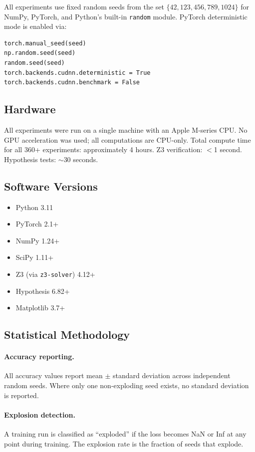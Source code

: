 \documentclass[10pt]{article}
\begin{document}
All experiments use fixed random seeds from the set $\{42, 123, 456, 789, 1024\}$ for NumPy, PyTorch, and Python's built-in \texttt{random} module.
PyTorch deterministic mode is enabled via:
\begin{verbatim}
torch.manual_seed(seed)
np.random.seed(seed)
random.seed(seed)
torch.backends.cudnn.deterministic = True
torch.backends.cudnn.benchmark = False
\end{verbatim}

\subsection{Hardware}

All experiments were run on a single machine with an Apple M-series CPU.
No GPU acceleration was used; all computations are CPU-only.
Total compute time for all 360+ experiments: approximately 4 hours.
Z3 verification: $<$1 second.
Hypothesis tests: $\sim$30 seconds.

\subsection{Software Versions}

\begin{itemize}[nosep]
    \item Python 3.11
    \item PyTorch 2.1+
    \item NumPy 1.24+
    \item SciPy 1.11+
    \item Z3 (via \texttt{z3-solver}) 4.12+
    \item Hypothesis 6.82+
    \item Matplotlib 3.7+
\end{itemize}

\subsection{Statistical Methodology}

\paragraph{Accuracy reporting.}
All accuracy values report mean $\pm$ standard deviation across independent random seeds.
Where only one non-exploding seed exists, no standard deviation is reported.

\paragraph{Explosion detection.}
A training run is classified as ``exploded'' if the loss becomes NaN or Inf at any point during training.
The explosion rate is the fraction of seeds that explode.
\end{document}
